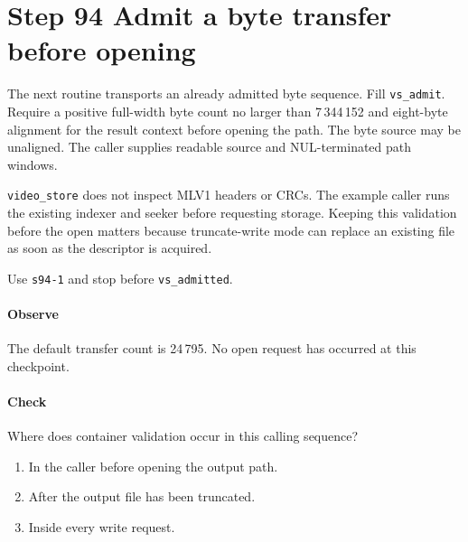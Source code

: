 \section{Step 94 Admit a byte transfer before opening}
The next routine transports an already admitted byte sequence. Fill \texttt{vs\_admit}. Require a positive full-width byte count no larger than 7\,344\,152 and eight-byte alignment for the result context before opening the path. The byte source may be unaligned. The caller supplies readable source and NUL-terminated path windows.

\texttt{video\_store} does not inspect MLV1 headers or CRCs. The example caller runs the existing indexer and seeker before requesting storage. Keeping this validation before the open matters because truncate-write mode can replace an existing file as soon as the descriptor is acquired.

Use \texttt{s94-1} and stop before \texttt{vs\_admitted}.

\paragraph{Observe} The default transfer count is 24\,795. No open request has occurred at this checkpoint.

\paragraph{Check} Where does container validation occur in this calling sequence?
\begin{enumerate}[label=\Alph*.]
\item In the caller before opening the output path.
\item After the output file has been truncated.
\item Inside every write request.
\end{enumerate}
